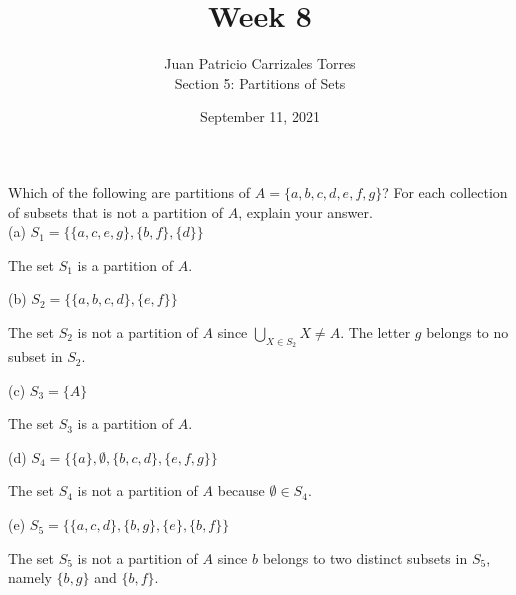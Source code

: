 \documentclass[12pt]{article}
\newenvironment{problem}[2][Problem]{\begin{trivlist}
		\item[\hskip \labelsep {\bfseries #1}\hskip \labelsep {\bfseries #2.}]}{\end{trivlist}}
\newenvironment{solution}[2][Solution]{\begin{trivlist}
		\item[\hskip \labelsep {\bfseries #1}\hskip \labelsep {\bfseries #2.}]}{\end{trivlist}}
\begin{document}
	
	\title{Week 8}
	\author{Juan Patricio Carrizales Torres \\
		Section 5: Partitions of Sets}
	\date{September 11, 2021}
	\maketitle

\begin{problem}{46}
	Which of the following are partitions of $A=\{a,b,c,d,e,f,g\}$? For each collection of subsets that is not a partition of $A$, explain your answer.\\
	
	(a) $S_{1} = \{\{a,c,e,g\},\{b,f\},\{d\}\}$
	\begin{solution}{a}
		The set $S_{1}$ is a partition of $A$.
	\end{solution}

	(b) $S_{2} = \{\{a,b,c,d\},\{e,f\}\}$
	\begin{solution}{b}
		The set $S_{2}$ is not a partition of $A$ since $\bigcup_{X\in S_{2}}X \neq A$. The letter $g$ belongs to no subset in $S_{2}$.
	\end{solution}

	(c) $S_{3} = \{A\}$
	\begin{solution}{c}
		The set $S_{3}$ is a partition of $A$.
	\end{solution}

	(d) $S_{4} = \{\{a\},\emptyset, \{b,c,d\}, \{e,f,g\}\}$
	\begin{solution}{d}
		The set $S_{4}$ is not a partition of $A$ because $\emptyset \in S_{4}$.
	\end{solution}

	(e)  $S_{5} = \{\{a,c,d\},\{b,g\},\{e\},\{b,f\}\}$
	\begin{solution}{e}
		The set $S_{5}$ is not a partition of $A$ since $b$ belongs to two distinct subsets in $S_{5}$, namely $\{b,g\}$ and $\{b,f\}$.
	\end{solution}
\end{problem}
\end{document}
